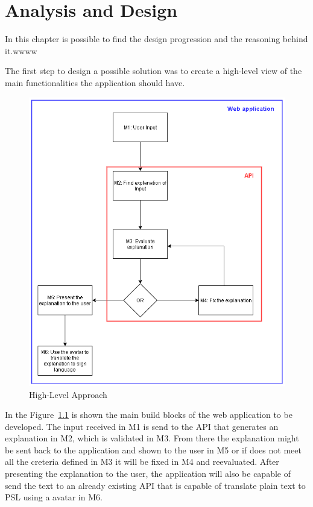 
\chapter{Analysis and Design} %
\label{chap:Chapter4} 

In this chapter is possible to find the design progression and the reasoning behind it.wwww

The first step to design a possible solution was to create a high-level view of the main functionalities the application should have.

\begin{figure}[H]
\centering
\includegraphics[scale=0.5]{ch4/assets/diagram1_2.png}
\caption[High-Level Approach]{High-Level Approach}
\label{fig:Diagram1}
\end{figure}

In the Figure~\ref{fig:Diagram1} is shown the main build blocks of the web application to be developed.
The input received in M1 is send to the \gls{API} that generates an explanation in M2, which is validated in M3.
From there the explanation might be sent back to the application and shown to the user in M5  or if does not meet all the creteria defined in M3 it will be fixed in M4 and reevaluated.
After presenting the explanation to the user, the application will also be capable of send the text to an already existing \gls{API} that is capable of translate plain text to \gls{PSL} using a avatar in M6.

